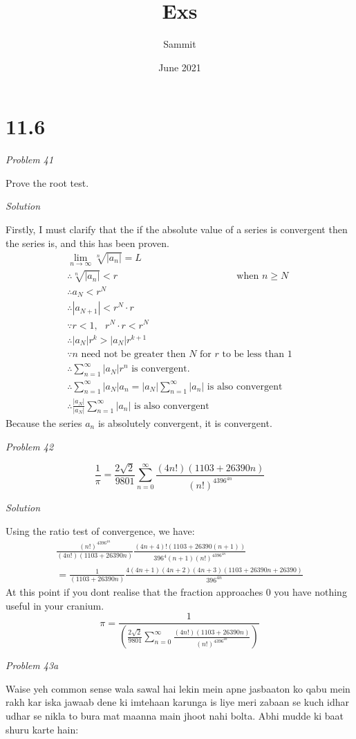 \documentclass{article}
\title{Exs}
\author{Sammit }
\date{June 2021}
\newcommand{\qstf}[1]{\begin{center}\textit{Problem #1}\end{center}}
\newcommand{\qst}[1]{\newpage \begin{center}\textit{Problem #1}\end{center}}
\newcommand{\sol}{\begin{center}\textit{Solution}\end{center}}
\newcommand{\thf}{\\\therefore}
\begin{document}
\maketitle

\section*{11.6}
\qstf{41}
Prove the root test.
\sol

Firstly, I must clarify that the if the absolute value of a series is convergent then the series is, and this has been proven.
\begin{gather*}
\lim_{n\to\infty}\sqrt[n]{|a_n|}=L
\\\therefore \sqrt[n]{|a_n|}<r\text{ }\text{ }\text{ }\text{ }\text{ }\text{ }\text{ }\text{ }\text{ }\text{ }\text{ }\text{ }\text{ }\text{ }\text{ }\text{ }\text{ }\text{ }\text{  when }n\geq N
\\\therefore a_N<r^N
\thf |a_{N+1}|<r^N \cdot r
\\\because r<1,\text{ } r^N \cdot r<r^N
\thf |a_{N}|r^{k}>|a_N|r^{k+1}
\\\because n \text{ need not be greater then }N\text{ for }r\text{ to be less than }1
\\\therefore \sum^{\infty}_{n=1}|a_N|r^{n} \text{ is convergent.}
\thf \sum^{\infty}_{n=1}|a_N|a_n =|a_N|\sum^{\infty}_{n=1}|a_n| \text{ is also convergent}
\thf\frac{|a_N|}{|a_N|}\sum^{\infty}_{n=1}|a_n| \text{ is also convergent}
\end{gather*}
Because the series $a_n$ is absolutely convergent, it is convergent.
\qst{42}
$$\frac{1}{\pi}=\frac{2\sqrt{2}}{9801}\sum^{\infty}_{n=0}\frac{(4n!)(1103+26390n)}{(n!)^4396^{4n}}$$
\sol
Using the ratio test of convergence, we have:
\begin{gather*}
\frac{(n!)^4396^{4n}}{(4n!)(1103+26390n)}\frac{(4n+4)!(1103+26390(n+1))}{396^4(n+1)(n!)^4396^{4n}}
\\=\frac{1}{(1103+26390n)}\frac{4(4n+1)(4n+2)(4n+3)(1103+26390n+26390)}{396^{4n}}
\end{gather*}
At this point if you dont realise that the fraction approaches 0 you have nothing useful in your cranium.
\newpage$$\pi = \frac{1}{(\frac{2\sqrt{2}}{9801}\sum^{\infty}_{n=0}\frac{(4n!)(1103+26390n)}{(n!)^4396^{4n}})}$$
\qst{43a}
Waise yeh common sense wala sawal hai lekin mein apne jasbaaton ko qabu mein rakh kar iska jawaab dene ki imtehaan karunga is liye meri zabaan se kuch idhar udhar se nikla to bura mat maanna main jhoot nahi bolta. Abhi mudde ki baat shuru karte hain:
\end{document}
